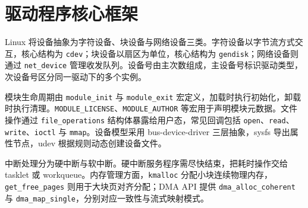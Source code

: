 \chapter{驱动程序核心框架}
Linux 将设备抽象为字符设备、块设备与网络设备三类。字符设备以字节流方式交互，核心结构为 \texttt{cdev}；块设备以扇区为单位，核心结构为 \texttt{gendisk}；网络设备则通过 \texttt{net\_{}device} 管理收发队列。设备号由主次数组成，主设备号标识驱动类型，次设备号区分同一驱动下的多个实例。\par
模块生命周期由 \texttt{module\_{}init} 与 \texttt{module\_{}exit} 宏定义，加载时执行初始化，卸载时执行清理。\texttt{MODULE\_{}LICENSE}、\texttt{MODULE\_{}AUTHOR} 等宏用于声明模块元数据。文件操作通过 \texttt{file\_{}operations} 结构体暴露给用户态，常见回调包括 \texttt{open}、\texttt{read}、\texttt{write}、\texttt{ioctl} 与 \texttt{mmap}。设备模型采用 bus-device-driver 三层抽象，sysfs 导出属性节点，udev 根据规则动态创建设备文件。\par
中断处理分为硬中断与软中断。硬中断服务程序需尽快结束，把耗时操作交给 tasklet 或 workqueue。内存管理方面，\texttt{kmalloc} 分配小块连续物理内存，\texttt{get\_{}free\_{}pages} 则用于大块页对齐分配；DMA API 提供 \texttt{dma\_{}alloc\_{}coherent} 与 \texttt{dma\_{}map\_{}single}，分别对应一致性与流式映射模式。\par
